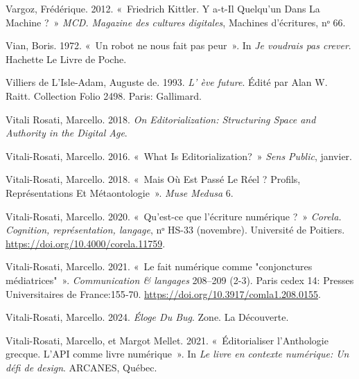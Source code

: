 \begin{CSLReferences}{1}{0}
\leavevmode{}%
Vargoz, Frédérique. 2012. {«~Friedrich {Kittler}. {Y} a-t-Il Quelqu'un
Dans La Machine ?~»} \emph{MCD. Magazine des cultures digitales},
Machines d'{é}critures, nᵒ 66.

\leavevmode{}%
Vian, Boris. 1972. {«~{Un robot ne nous fait pas peur}~»}. In \emph{{Je
voudrais pas crever}}. {Hachette Le Livre de Poche}.

\leavevmode{}%
Villiers de L'Isle-Adam, Auguste de. 1993. \emph{{L' {è}ve future}}.
Édité par Alan W. Raitt. {Collection Folio} 2498. {Paris}: {Gallimard}.

\leavevmode{}%
Vitali Rosati, Marcello. 2018. \emph{On {Editorialization}: {Structuring
Space} and {Authority} in the {Digital Age}}.

\leavevmode{}%
Vitali-Rosati, Marcello. 2016. {«~What {Is Editorialization}?~»}
\emph{Sens Public}, janvier.

\leavevmode{}%
Vitali-Rosati, Marcello. 2018. {«~Mais O{ù} Est Pass{é} Le R{é}el ?
{Profils}, Repr{é}sentations Et M{é}taontologie~»}. \emph{Muse Medusa}
6.

\leavevmode{}%
Vitali-Rosati, Marcello. 2020. {«~{Qu'est-ce que l'{é}criture
num{é}rique ?}~»} \emph{Corela. Cognition, repr{é}sentation, langage},
nᵒ HS-33 (novembre). {Universit{é} de Poitiers}.
\url{https://doi.org/10.4000/corela.11759}.

\leavevmode{}%
Vitali-Rosati, Marcello. 2021. {«~{Le fait num{é}rique comme
"conjonctures m{é}diatrices"}~»}. \emph{Communication \& langages}
208--209 (2-3). {Paris cedex 14}: {Presses Universitaires de
France}:155‑70. \url{https://doi.org/10.3917/comla1.208.0155}.

\leavevmode{}%
Vitali-Rosati, Marcello. 2024. \emph{{É}loge Du Bug}. Zone. {La
D{é}couverte}.

\leavevmode{}%
Vitali-Rosati, Marcello, et Margot Mellet. 2021. {«~{{É}ditorialiser
l'Anthologie grecque. L'API comme livre num{é}rique}~»}. In \emph{{Le
livre en contexte num{é}rique: Un d{é}fi de design}}. {ARCANES,
Qu{é}bec}.


\end{CSLReferences}
